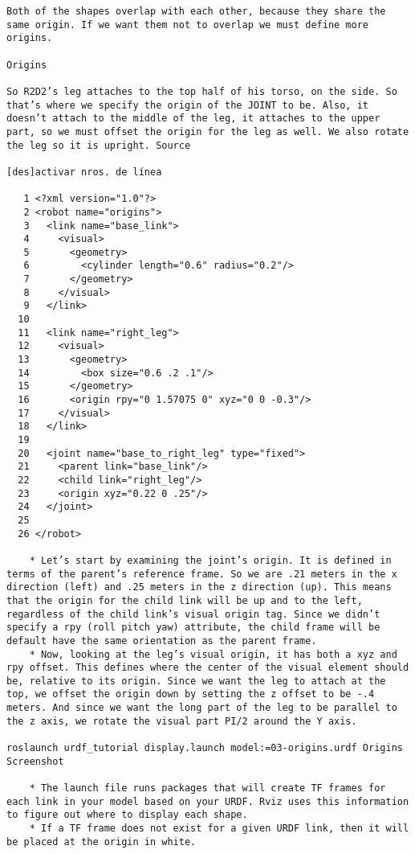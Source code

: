 \begin{verbatim}
Both of the shapes overlap with each other, because they share the same origin. If we want them not to overlap we must define more origins.

Origins

So R2D2’s leg attaches to the top half of his torso, on the side. So that’s where we specify the origin of the JOINT to be. Also, it doesn’t attach to the middle of the leg, it attaches to the upper part, so we must offset the origin for the leg as well. We also rotate the leg so it is upright. Source

[des]activar nros. de línea

   1 <?xml version="1.0"?>
   2 <robot name="origins">
   3   <link name="base_link">
   4     <visual>
   5       <geometry>
   6         <cylinder length="0.6" radius="0.2"/>
   7       </geometry>
   8     </visual>
   9   </link>
  10 
  11   <link name="right_leg">
  12     <visual>
  13       <geometry>
  14         <box size="0.6 .2 .1"/>
  15       </geometry>
  16       <origin rpy="0 1.57075 0" xyz="0 0 -0.3"/>
  17     </visual>
  18   </link>
  19 
  20   <joint name="base_to_right_leg" type="fixed">
  21     <parent link="base_link"/>
  22     <child link="right_leg"/>
  23     <origin xyz="0.22 0 .25"/>
  24   </joint>
  25 
  26 </robot>

    * Let’s start by examining the joint’s origin. It is defined in terms of the parent’s reference frame. So we are .21 meters in the x direction (left) and .25 meters in the z direction (up). This means that the origin for the child link will be up and to the left, regardless of the child link’s visual origin tag. Since we didn’t specify a rpy (roll pitch yaw) attribute, the child frame will be default have the same orientation as the parent frame.
    * Now, looking at the leg’s visual origin, it has both a xyz and rpy offset. This defines where the center of the visual element should be, relative to its origin. Since we want the leg to attach at the top, we offset the origin down by setting the z offset to be -.4 meters. And since we want the long part of the leg to be parallel to the z axis, we rotate the visual part PI/2 around the Y axis. 

roslaunch urdf_tutorial display.launch model:=03-origins.urdf Origins Screenshot

    * The launch file runs packages that will create TF frames for each link in your model based on your URDF. Rviz uses this information to figure out where to display each shape.
    * If a TF frame does not exist for a given URDF link, then it will be placed at the origin in white. 


\end{verbatim}
